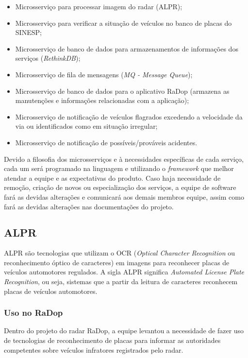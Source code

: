 \begin{itemize}
    \item Microsserviço para processar imagem do radar (ALPR);
    \item Microsserviço para verificar a situação de veículos no banco de placas do SINESP;
    \item Microsserviço de banco de dados para armazenamentos de informações dos serviços (\textit{RethinkDB});
    \item Microsserviço de fila de mensagens (\textit{MQ - Message Queue});
    \item Microsserviço de banco de dados para o aplicativo RaDop (armazena as manutenções e informações relacionadas com a aplicação);
    \item Microsserviço de notificação de veículos flagrados excedendo a velocidade da via ou identificados como em situação irregular;
    \item Microsserviço de notificação de possíveis/prováveis acidentes.
\end{itemize}

Devido a filosofia dos microsserviços e à necessidades específicas de cada serviço, cada um será programado na linguagem e utilizando o \textit{framework} que melhor atendar a equipe e as expectativas do produto.
Caso haja necessidade de remoção, criação de novos ou especialização dos serviços, a equipe de software fará as devidas alterações e comunicará aos demais membros equipe, assim como fará as devidas alterações nas documentações do projeto.

\subsection{ALPR}

ALPR são tecnologias que utilizam o OCR (\textit{Optical Character Recognition} ou reconhecimento óptico de caracteres) em imagens para reconhecer placas de veículos automotores regulados. A sigla ALPR significa \textit{Automated License Plate Recognition}, ou seja, sistemas que a partir da leitura de caracteres reconhecem placas de veículos automotores.

\subsubsection{Uso no RaDop}

Dentro do projeto do radar RaDop, a equipe levantou a necessidade de fazer uso de tecnologias de reconhecimento de placas para informar as autoridades competentes sobre veículos infratores registrados pelo radar.

